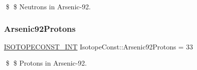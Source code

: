 \$ \$ Neutrons in Arsenic-\/92. \mbox{\label{group___isotope_const-_arsenic-_as92_ga69422de8c001da5c270cfce91c6b791a}} 
\subsubsection{\texorpdfstring{Arsenic92\+Protons}{Arsenic92Protons}}
{\footnotesize\ttfamily \mbox{\hyperlink{group___isotope_const-_macros_ga5f18360b3e99483a35c32d789e62621c}{I\+S\+O\+T\+O\+P\+E\+C\+O\+N\+S\+T\+\_\+\+I\+NT}} Isotope\+Const\+::\+Arsenic92\+Protons = 33}

\$ \$ Protons in Arsenic-\/92. 